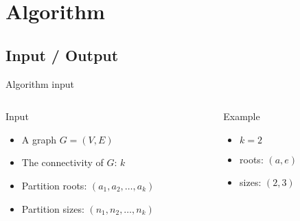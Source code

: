 \newcommand{\columntitle}[1]{{\begin{center} \Large #1 \end{center}}\vspace{-0.5cm}}

\section{Algorithm}

\subsection{Input / Output}

\begin{frame}{Algorithm input}
  \begin{columns}[c]
    \begin{column}[T]{.5\textwidth}
      \columntitle{Input}
      \begin{itemize}
      \item A graph $G = (V,E)$
      \item The connectivity of $G$: $k$
      \item Partition roots: $(a_1, a_2, \dots, a_k)$
      \item Partition sizes: $(n_1, n_2, \dots, n_k)$
      \end{itemize}
    \end{column}
    \begin{column}[T]{.5\textwidth}
      \columntitle{Example}
      \begin{itemize}
      \item $k = 2$
      \item roots: $(a, e)$
      \item sizes: $(2, 3)$
      \end{itemize}
      \begin{tikzpicture}[scale=0.5]
        
      \end{tikzpicture}
    \end{column}
  \end{columns}
\end{frame}

